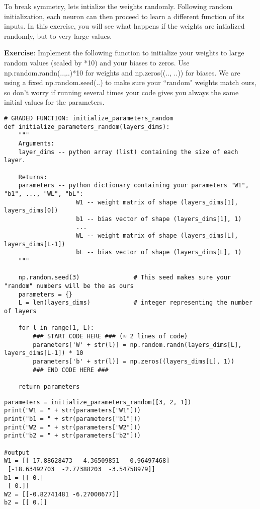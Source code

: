 
To break symmetry, lets intialize the weights randomly. Following random initialization, each neuron can then proceed to learn a different function of its inputs. In this exercise, you will see what happens if the weights are intialized randomly, but to very large values.

{\textbf {Exercise}}: Implement the following function to initialize your weights to large random values (scaled by *10) and your biases to zeros. Use np.random.randn(..,..)*10 for weights and np.zeros((.., ..)) for biases. We are using a fixed np.random.seed(..) to make sure your ``random" weights match ours, so don't worry if running several times your code gives you always the same initial values for the parameters.

\begin{verbatim}
# GRADED FUNCTION: initialize_parameters_random
def initialize_parameters_random(layers_dims):
    """
    Arguments:
    layer_dims -- python array (list) containing the size of each layer.
    
    Returns:
    parameters -- python dictionary containing your parameters "W1", "b1", ..., "WL", "bL":
                    W1 -- weight matrix of shape (layers_dims[1], layers_dims[0])
                    b1 -- bias vector of shape (layers_dims[1], 1)
                    ...
                    WL -- weight matrix of shape (layers_dims[L], layers_dims[L-1])
                    bL -- bias vector of shape (layers_dims[L], 1)
    """
    
    np.random.seed(3)               # This seed makes sure your "random" numbers will be the as ours
    parameters = {}
    L = len(layers_dims)            # integer representing the number of layers
    
    for l in range(1, L):
        ### START CODE HERE ### (≈ 2 lines of code)
        parameters['W' + str(l)] = np.random.randn(layers_dims[L], layers_dims[L-1]) * 10
        parameters['b' + str(l)] = np.zeros((layers_dims[L], 1))
        ### END CODE HERE ###

    return parameters
\end{verbatim}
\begin{verbatim}
parameters = initialize_parameters_random([3, 2, 1])
print("W1 = " + str(parameters["W1"]))
print("b1 = " + str(parameters["b1"]))
print("W2 = " + str(parameters["W2"]))
print("b2 = " + str(parameters["b2"]))    

#output
W1 = [[ 17.88628473   4.36509851   0.96497468]
 [-18.63492703  -2.77388203  -3.54758979]]
b1 = [[ 0.]
 [ 0.]]
W2 = [[-0.82741481 -6.27000677]]
b2 = [[ 0.]]
\end{verbatim}

